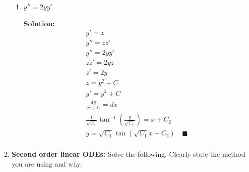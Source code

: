 \documentclass[letterpaper, fontsize=11pt]{scrartcl} %
\numberwithin{equation}{section} %
\numberwithin{figure}{section} %
\numberwithin{table}{section} %
\begin{document}
\begin{enumerate}
\begin{enumerate}
\item $y'' = 2y y'$
\par \textbf{Solution:}
\begin{gather*}
y' = z\\
y'' = z z'\\
y'' = 2y y'\\
zz' = 2yz\\
z' = 2y\\
z = y^2 + C\\
y' = y^2 + C\\
\frac{dy}{y^2 + C} = dx\\
\frac{1}{\sqrt{C_1}}\tan^{-1}\left(\frac{y}{\sqrt{C_1}}\right) = x + C_2\\
y = \sqrt{C_1}\tan(\sqrt{C_1}x + C_2)\quad\blacksquare\\
\end{gather*}

\end{enumerate}


\item \textbf{Second order linear ODEs:} Solve the following. Clearly state the method you are using and why.
\begin{enumerate}


\end{enumerate}
\end{enumerate}
\end{document}
